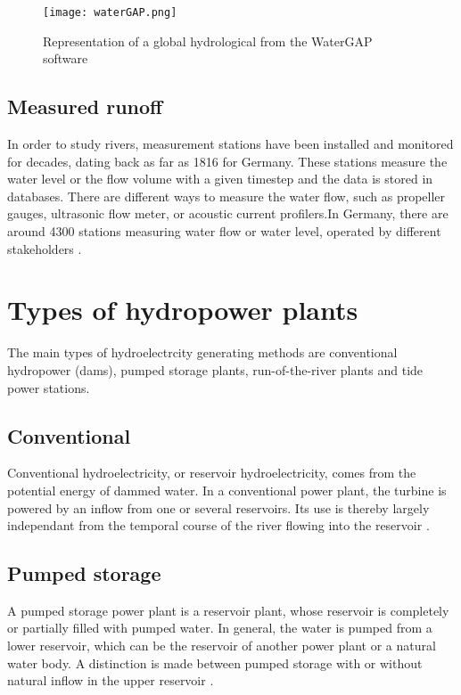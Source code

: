 \begin{figure}[H]
\texttt{[image: waterGAP.png]}
\caption[Representation of a global hydrological from the WaterGAP software]{Representation of a global hydrological from the WaterGAP software \cite{doll}}
\centering
\label{waterGAP}
\end{figure}

 
\subsection{Measured runoff}
 
In order to study rivers, measurement stations have been installed and monitored for decades, dating back as far as 1816 for Germany. These stations measure the water level or the flow volume with a given timestep and the data is stored in databases. There are different ways to measure the water flow, such as propeller gauges, ultrasonic flow meter, or acoustic current profilers.In Germany, there are around 4300 stations measuring water flow or water level, operated by different stakeholders \cite{bafg_hyd}.
 
\section{Types of hydropower plants}

The main types of hydroelectrcity generating methods are conventional hydropower (dams), pumped storage plants, run-of-the-river plants and tide power stations.

\subsection{Conventional}

Conventional hydroelectricity, or reservoir hydroelectricity, comes from the potential energy of dammed water. In a conventional power plant, the turbine is powered by an inflow from one or several reservoirs. Its use is thereby largely independant from the temporal course of the river flowing into the reservoir \cite{vgb}.

\subsection{Pumped storage}

A pumped storage power plant is a reservoir plant, whose reservoir is completely or partially filled with pumped water. In general, the water is pumped from a lower reservoir, which can be the reservoir of another power plant or a natural water body. A distinction is made between pumped storage with or without natural inflow in the upper reservoir \cite{vgb}.

